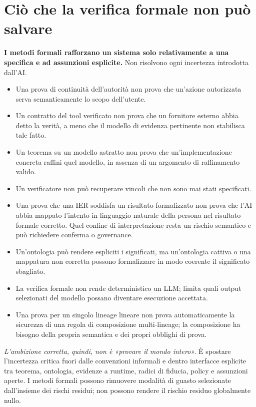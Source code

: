 \documentclass[10pt,oneside,openany]{book}
\begin{document}
\chapter{Ciò che la verifica formale non può salvare}

\textbf{I metodi formali rafforzano un sistema solo relativamente a una specifica e ad assunzioni esplicite.} Non risolvono ogni incertezza introdotta dall'AI.

\begin{itemize}
\item Una prova di continuità dell'autorità non prova che un'azione autorizzata serva semanticamente lo scopo dell'utente.
\item Un contratto del tool verificato non prova che un fornitore esterno abbia detto la verità, a meno che il modello di evidenza pertinente non stabilisca tale fatto.
\item Un teorema su un modello astratto non prova che un'implementazione concreta raffini quel modello, in assenza di un argomento di raffinamento valido.
\item Un verificatore non può recuperare vincoli che non sono mai stati specificati.
\item Una prova che una IER soddisfa un risultato formalizzato non prova che l'AI abbia mappato l'intento in linguaggio naturale della persona nel risultato formale corretto. Quel confine di interpretazione resta un rischio semantico e può richiedere conferma o governance.
\item Un'ontologia può rendere espliciti i significati, ma un'ontologia cattiva o una mappatura non corretta possono formalizzare in modo coerente il significato sbagliato.
\item La verifica formale non rende deterministico un LLM; limita quali output selezionati del modello possano diventare esecuzione accettata.
\item Una prova per un singolo lineage lineare non prova automaticamente la sicurezza di una regola di composizione multi-lineage; la composizione ha bisogno della propria semantica e dei propri obblighi di prova.
\end{itemize}

\emph{L'ambizione corretta, quindi, non è «provare il mondo intero».} È spostare l'incertezza critica fuori dalle convenzioni informali e dentro interfacce esplicite tra teorema, ontologia, evidenze a runtime, radici di fiducia, policy e assunzioni aperte. I metodi formali possono rimuovere modalità di guasto selezionate dall'insieme dei rischi residui; non possono rendere il rischio residuo globalmente nullo.
\end{document}
